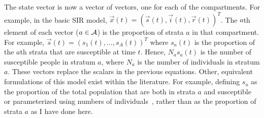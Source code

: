 \documentclass[thesis.tex]{subfiles}
\begin{document}
The state vector is now a vector of vectors, one for each of the compartments.
For example, in the basic SIR model, $\vec{x}(t) = (\vec{s}(t), \vec{i}(t), \vec{r}(t))^T$.
The $a$th element of each vector ($a \in \mathcal{A}$) is the proportion of strata $a$ in that compartment.
For example, $\vec{s}(t) = (s_1(t), \dots, s_A(t))^T$ where $s_a(t)$ is the proportion of the $a$th strata that are susceptible at time $t$.
Hence, $N_a s_a(t)$ is the number of susceptible people in stratum $a$, where $N_a$ is the number of individuals in stratum $a$.
These vectors replace the scalars in the previous equations.
Other, equivalent formulations of this model exist within the literature.
For example, defining $s_a$ as the proportion of the total population that are both in strata $a$ and susceptible or parameterized using numbers of individuals~\autocite[57]{keelingModeling}, rather than as the proportion of strata $a$ as I have done here.
\end{document}
